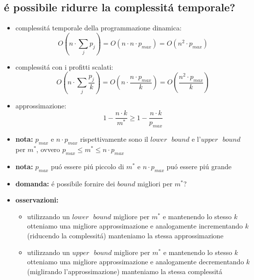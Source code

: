 
\subsection*{\'e possibile ridurre la complessit\'a temporale?}
\begin{flushleft}
	\begin{itemize}
		\item complessit\'a temporale della programmazione dinamica:
			$$O(n\cdot\sum_{j}p_j)=O(n\cdot n\cdot p_{max})=O(n^2\cdot p_{max})$$
		\item complessit\'a con i profitti scalati:
			$$O(n\cdot\sum_{j}\frac{p_j}{k})=O(n\cdot\frac{n\cdot p_{max}}{k})=O(\frac{n^2\cdot p_{max}}{k})$$
		\item approssimazione:
			$$1-\frac{n\cdot k}{m^*}\geq 1-\frac{n\cdot k}{p_{max}}$$
		\item \textbf{nota:} $p_{max}$ e $n\cdot p_{max}$ rispettivamente sono il $lower\text{ }bound$ e l'$upper\text{ }bound$ per $m^*$, ovvero $p_{max}\leq m^*\leq n\cdot p_{max}$
		\item \textbf{nota:} $p_{max}$ pu\'o essere pi\'u piccolo di $m^*$ e $n\cdot p_{max}$ pu\'o essere pi\'u grande
		\item \textbf{domanda:} \'e possibile fornire dei $bound$ migliori per $m^*$?
		\item \textbf{osservazioni:}
		\begin{itemize}
			\item utilizzando un $lower\text{ }bound$ migliore per $m^*$ e mantenendo lo stesso $k$ otteniamo una migliore approssimazione e analogamente incrementando $k$ (riducendo la complessit\'a) manteniamo la stessa approssimazione
			\item utilizzando un $upper\text{ }bound$ migliore per $m^*$ e mantenendo lo stesso $k$ otteniamo una migliore approssimazione e analogamente decrementando $k$ (miglirando l'approssimazione) manteniamo la stessa complessit\'a
		\end{itemize}
	\end{itemize}
\end{flushleft}


